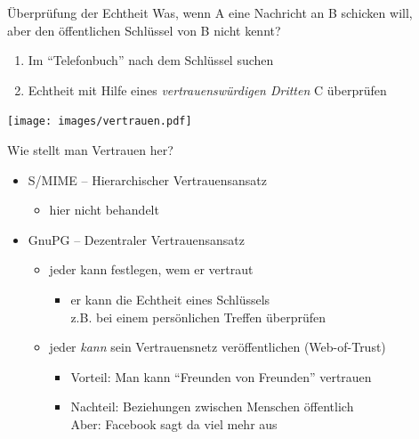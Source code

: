 \begin{frame}{Überprüfung der Echtheit}
Was, wenn A eine Nachricht an B schicken will,\\ aber den öffentlichen Schlüssel von B nicht kennt?\\
\begin{enumerate}
  \item Im ``Telefonbuch'' nach dem Schlüssel suchen
  \item Echtheit mit Hilfe eines \emph{vertrauenswürdigen Dritten} C überprüfen
\end{enumerate}
\begin{center}
  \texttt{[image: images/vertrauen.pdf]}
\end{center}
\end{frame}

\begin{frame}{Wie stellt man Vertrauen her?}
  \begin{itemize}
    \item S/MIME -- Hierarchischer Vertrauensansatz
    \begin{itemize}
      \item hier nicht behandelt
    \end{itemize}
    \item GnuPG -- Dezentraler Vertrauensansatz
    \begin{itemize}
      \item jeder kann festlegen, wem er vertraut
      \begin{itemize}
        \item er kann die Echtheit eines Schlüssels\\ z.B. bei einem persönlichen Treffen überprüfen
      \end{itemize}
      \item jeder \emph{kann} sein Vertrauensnetz veröffentlichen (Web-of-Trust)
      \begin{itemize}
        \item Vorteil: Man kann ``Freunden von Freunden'' vertrauen
        \item Nachteil: Beziehungen zwischen Menschen öffentlich\\ Aber: Facebook sagt da viel mehr aus
      \end{itemize}
    \end{itemize}
  \end{itemize}
\end{frame}

